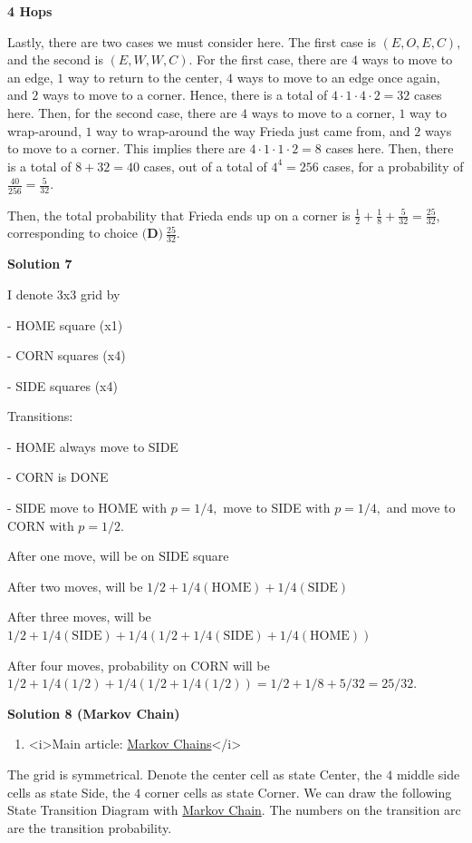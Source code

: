 \begin{enumerate}
 \textbf{ 4 Hops } 

 Lastly, there are two cases we must consider here. The first case is $(E, O, E, C)$, and the second is $(E, W, W, C)$. For the first case, there are $4$ ways to move to an edge, $1$ way to return to the center, $4$ ways to move to an edge once again, and $2$ ways to move to a corner. Hence, there is a total of $4 \cdot 1 \cdot 4 \cdot 2 = 32$ cases here. Then, for the second case, there are $4$ ways to move to a corner, $1$ way to wrap-around, $1$ way to wrap-around the way Frieda just came from, and $2$ ways to move to a corner. This implies there are $4 \cdot 1 \cdot 1 \cdot 2 = 8$ cases here. Then, there is a total of $8+32 = 40$ cases, out of a total of $4^4 = 256$ cases, for a probability of $\frac{40}{256} = \frac{5}{32}$. 

 Then, the total probability that Frieda ends up on a corner is $\frac{1}{2} + \frac{1}{8} + \frac{5}{32} = \frac{25}{32}$, corresponding to choice $\boxed{\textbf{(D)}  ~\frac{25}{32}}$. 

 



\textbf{Solution 7}

I denote 3x3 grid by

 - HOME square (x1)

 - CORN squares (x4)

 - SIDE squares (x4)

 Transitions:

 - HOME always move to SIDE

 - CORN is DONE

 - SIDE move to HOME with $p=1/4,$ move to SIDE with $p=1/4,$ and move to CORN with $p=1/2.$

 After one move, will be on $\text{SIDE}$ square

 After two moves, will be $1/2 + 1/4 (\text{HOME}) + 1/4 (\text{SIDE})$

 After three moves, will be $1/2 + 1/4 (\text{SIDE}) + 1/4 (1/2 + 1/4(\text{SIDE}) + 1/4(\text{HOME}))$

 After four moves, probability on CORN will be $1/2 + 1/4 (1/2) + 1/4( 1/2 + 1/4(1/2)) = 1/2 + 1/8 + 5/32 = 25 / 32.$




\textbf{Solution 8 (Markov Chain)}


            \begin{enumerate}[label=(\roman*)]
                \item <i>Main article: \href{https://artofproblemsolving.com/wiki/index.php?title=Markov\_Chains}{Markov Chains}</i>
            \end{enumerate}
            The grid is symmetrical. Denote the center cell as state Center, the $4$ middle side cells as state Side, the $4$ corner cells as state Corner. We can draw the following State Transition Diagram with \href{https://en.wikipedia.org/wiki/Markov\_chain}{Markov Chain}. The numbers on the transition arc are the transition probability. 


\end{enumerate}
